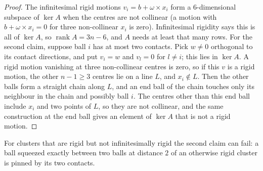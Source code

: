 \documentclass[11pt,openany]{book}
\theoremstyle{plain}
\theoremstyle{definition}
\theoremstyle{remark}
\begin{document}
\begin{proof}
The infinitesimal rigid motions $v_i=b+\omega\times x_i$ form a $6$-dimensional subspace of $\ker A$ when the
centres are not collinear (a motion with $b+\omega\times x_i=0$ for three non-collinear $x_i$ is zero).
Infinitesimal rigidity says this is all of $\ker A$, so $\operatorname{rank}A=3n-6$, and $A$ needs at least
that many rows. For the second claim, suppose ball $i$ has at most two contacts. Pick $w\ne0$ orthogonal
to its contact directions, and put $v_i=w$ and $v_l=0$ for $l\ne i$; this lies in $\ker A$. A rigid motion
vanishing at three non-collinear centres is zero, so if this $v$ is a rigid motion, the other $n-1\ge3$
centres lie on a line $L$, and $x_i\notin L$. Then the other balls form a straight chain along $L$, and an
end ball of the chain touches only its neighbour in the chain and possibly ball $i$. The centres other
than this end ball include $x_i$ and two points of $L$, so they are not collinear, and the same
construction at the end ball gives an element of $\ker A$ that is not a rigid motion.
\end{proof}

\noindent For clusters that are rigid but not infinitesimally rigid the second claim can fail: a ball
squeezed exactly between two balls at distance $2$ of an otherwise rigid cluster is pinned by its two
contacts.
\end{document}
